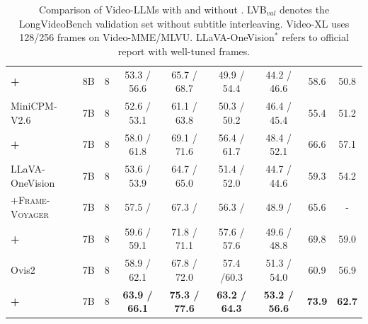 \begin{table}[!t]
\begin{tabular}{lcccccccc}
	\rowcolor{gray!30}   
	\rule{0pt}{2ex} \textbf{+\mname}
	                & 8B & 8 & 53.3	/ 56.6 & 65.7 / 68.7 & 49.9 / 54.4 & 44.2 / 46.6 & 58.6 & 50.8 \\
	\hdashline
	MiniCPM-V2.6    & 7B & 8 & 52.6	/ 53.1 & 61.1 / 63.8 & 50.3	/ 50.2 & 46.4 / 45.4 & 55.4 & 51.2 \\
	\rowcolor{gray!30}
	\rule{0pt}{2ex} \textbf{+\mname} 
	                & 7B & 8 & 58.0 / 61.8 & 69.1 / 71.6 & 56.4 / 61.7 & 48.4 / 52.1 & 66.6 & 57.1 \\
	\hdashline
	LLaVA-OneVision & 7B & 8 & 53.6 / 53.9 & 64.7 / 65.0 & 51.4 / 52.0 & 44.7 / 44.6 & 59.3 & 54.2 \\
	\rule{0pt}{2ex} +\textsc{Frame-Voyager}\xspace
				    & 7B & 8 & 57.5 / \unk & 67.3 / \unk & 56.3 / \unk & 48.9 / \unk & 65.6 &   - \\
	\rowcolor{gray!30}	
	\rule{0pt}{2ex} \textbf{+\mname} 
	                & 7B & 8 & 59.6 / 59.1 & 71.8 / 71.1 & 57.6 / 57.6 & 49.6 / 48.8 & 69.8 & 59.0 \\
	\hdashline
	Ovis2 & 7B & 8 & 58.9 / 62.1 & 67.8 / 72.0 & 57.4 /60.3 & 51.3 / 54.0 & 60.9 & 56.9 \\
	\rowcolor{gray!30}
	\rule{0pt}{2ex} \textbf{+\mname} 
	                & 7B & 8 & \textbf{63.9 / 66.1} & \textbf{75.3 / 77.6} & \textbf{63.2 / 64.3} & \textbf{53.2 / 56.6} & \textbf{73.9} & \textbf{62.7} \\
	\bottomrule
	\end{tabular}
	\caption{
	Comparison of Video-LLMs with and without \mname{}.
	LVB$_{val}$ denotes the LongVideoBench validation set without subtitle interleaving.
	Video-XL uses 128/256 frames on Video-MME/MLVU.
	LLaVA-OneVision$^*$ refers to official report with well-tuned frames.
	}
	\label{tab:main_results}
\end{table}
